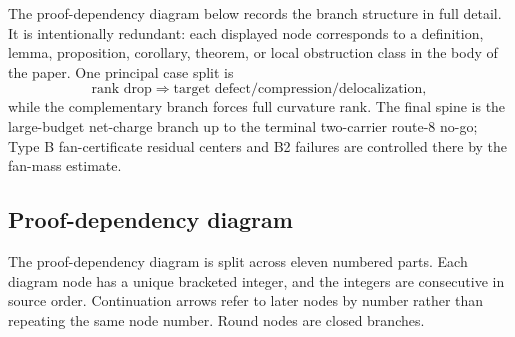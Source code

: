 \documentclass[11pt]{article}
\begin{document}
The proof-dependency diagram below records the branch structure in full detail.  It is intentionally redundant: each displayed node corresponds to a definition, lemma, proposition, corollary, theorem, or local obstruction class in the body of the paper.  One principal case split is
\[
\text{rank drop}\Rightarrow\text{target defect/compression/delocalization},
\]
while the complementary branch forces full curvature rank.  The final spine is
the large-budget net-charge branch up to the terminal two-carrier route-8
no-go; Type B fan-certificate residual centers and B2 failures are controlled
there by the fan-mass estimate.



\subsection*{Proof-dependency diagram}

The proof-dependency diagram is split across eleven numbered parts.  Each
diagram node has a unique bracketed integer, and the integers are consecutive
in source order.  Continuation arrows refer to later nodes by number rather
than repeating the same node number.  Round nodes are closed branches.
\end{document}
